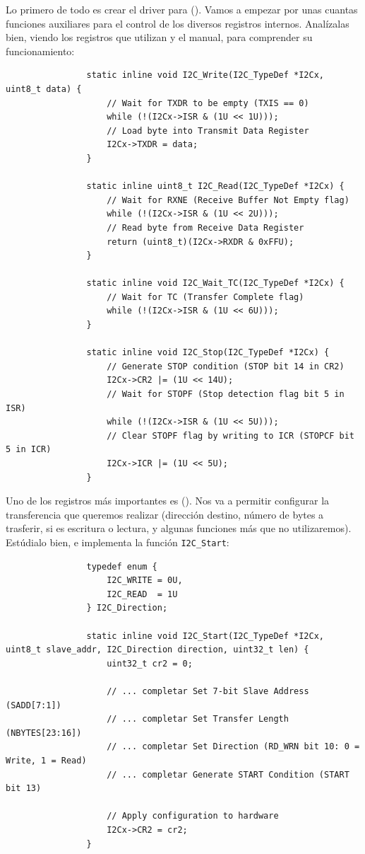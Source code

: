 \documentclass[../main.tex]{subfiles}
\begin{document}
            Lo primero de todo es crear el driver para  (\REFMAN[26]). Vamos a empezar por unas cuantas funciones auxiliares para el control de los diversos registros internos. Analízalas bien, viendo los registros que utilizan y el manual, para comprender su funcionamiento:

            \begin{lstlisting}
                static inline void I2C_Write(I2C_TypeDef *I2Cx, uint8_t data) {
                    // Wait for TXDR to be empty (TXIS == 0)
                    while (!(I2Cx->ISR & (1U << 1U)));
                    // Load byte into Transmit Data Register
                    I2Cx->TXDR = data;
                }

                static inline uint8_t I2C_Read(I2C_TypeDef *I2Cx) {
                    // Wait for RXNE (Receive Buffer Not Empty flag)
                    while (!(I2Cx->ISR & (1U << 2U)));
                    // Read byte from Receive Data Register
                    return (uint8_t)(I2Cx->RXDR & 0xFFU);
                }

                static inline void I2C_Wait_TC(I2C_TypeDef *I2Cx) {
                    // Wait for TC (Transfer Complete flag)
                    while (!(I2Cx->ISR & (1U << 6U)));
                }

                static inline void I2C_Stop(I2C_TypeDef *I2Cx) {
                    // Generate STOP condition (STOP bit 14 in CR2)
                    I2Cx->CR2 |= (1U << 14U);
                    // Wait for STOPF (Stop detection flag bit 5 in ISR)
                    while (!(I2Cx->ISR & (1U << 5U)));
                    // Clear STOPF flag by writing to ICR (STOPCF bit 5 in ICR)
                    I2Cx->ICR |= (1U << 5U);
                }
            \end{lstlisting}

            Uno de los registros más importantes es  (\REFMAN[26.9.2]). Nos va a permitir configurar la transferencia que queremos realizar (dirección destino, número de bytes a trasferir, si es escritura o lectura, y algunas funciones más que no utilizaremos). Estúdialo bien, e implementa la función \texttt{I2C\_Start}:

            \begin{lstlisting}
                typedef enum {
                    I2C_WRITE = 0U,
                    I2C_READ  = 1U
                } I2C_Direction;

                static inline void I2C_Start(I2C_TypeDef *I2Cx, uint8_t slave_addr, I2C_Direction direction, uint32_t len) {
                    uint32_t cr2 = 0;

                    // ... completar Set 7-bit Slave Address (SADD[7:1])
                    // ... completar Set Transfer Length (NBYTES[23:16])
                    // ... completar Set Direction (RD_WRN bit 10: 0 = Write, 1 = Read)
                    // ... completar Generate START Condition (START bit 13)

                    // Apply configuration to hardware
                    I2Cx->CR2 = cr2;
                }
            \end{lstlisting}
            
\end{document}
